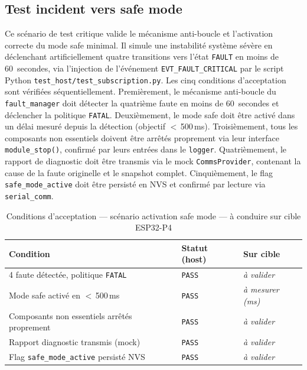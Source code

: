 \subsection{Test incident vers safe mode}
\label{subsec:t_safe}

Ce scénario de test critique valide le mécanisme anti-boucle et
l'activation correcte du mode safe minimal. Il simule une instabilité
système sévère en déclenchant artificiellement quatre transitions
vers l'état \texttt{FAULT} en moins de 60~secondes, via l'injection
de l'événement \texttt{EVT\_FAULT\_CRITICAL} par le script Python
\texttt{test\_host/test\_subscription.py}. Les cinq conditions
d'acceptation sont vérifiées séquentiellement. Premièrement, le
mécanisme anti-boucle du \texttt{fault\_manager} doit détecter la
quatrième faute en moins de 60~secondes et déclencher la politique
\texttt{FATAL}. Deuxièmement, le mode safe doit être activé dans un
délai mesuré depuis la détection (objectif $<$\,500\,ms). Troisièmement,
tous les composants non essentiels doivent être arrêtés proprement
via leur interface \texttt{module\_stop()}, confirmé par leurs
entrées dans le \texttt{logger}. Quatrièmement, le rapport de
diagnostic doit être transmis via le mock \texttt{CommsProvider},
contenant la cause de la faute originelle et le snapshot complet.
Cinquièmement, le flag \texttt{safe\_mode\_active} doit être
persisté en NVS et confirmé par lecture via \texttt{serial\_comm}.

\begin{table}[H]
\centering
\renewcommand{\arraystretch}{1.5}
\caption{Conditions d'acceptation — scénario activation safe mode — à conduire sur cible ESP32-P4}
\label{tab:res_safe}
\small
\begin{tabular}{|p{6.2cm}|p{2.0cm}|p{2.8cm}|}
\hline
\rowcolor{gray!20}
\textbf{Condition} & \textbf{Statut (host)} & \textbf{Sur cible} \\
\hline
4\ieme{} faute détectée, politique \texttt{FATAL} & \texttt{PASS} & \textit{à valider} \\
\hline
Mode safe activé en $<$\,500\,ms                   & \texttt{PASS} & \textit{à mesurer (ms)} \\
\hline
Composants non essentiels arrêtés proprement       & \texttt{PASS} & \textit{à valider} \\
\hline
Rapport diagnostic transmis (mock)                  & \texttt{PASS} & \textit{à valider} \\
\hline
Flag \texttt{safe\_mode\_active} persisté NVS       & \texttt{PASS} & \textit{à valider} \\
\hline
\end{tabular}
\end{table}


